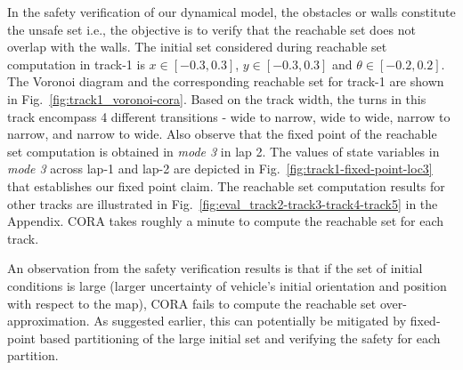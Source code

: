 In the safety verification of our dynamical model, the obstacles or walls constitute the unsafe set i.e., the objective is to verify that the reachable set does not overlap with the walls. 
%
%
The initial set considered during reachable set computation in track-1 is $x \in [-0.3, 0.3]$, $y \in [-0.3, 0.3]$ and $\theta \in [-0.2, 0.2]$.
The Voronoi diagram and the corresponding reachable set for track-1 are shown in Fig.~\ref{fig:track1_voronoi-cora}. Based on the track width, the turns in this track encompass 4 different transitions - wide to narrow, wide to wide, narrow to narrow, and narrow to wide. 
%
Also observe that the fixed point of the reachable set computation is obtained in \emph{mode 3} in lap 2. The values of state variables in \emph{mode 3} across lap-1 and lap-2 are depicted in Fig.~\ref{fig:track1-fixed-point-loc3} that establishes our fixed point claim. The reachable set computation results for other tracks are illustrated in Fig.~\ref{fig:eval_track2-track3-track4-track5} in the Appendix. CORA takes roughly a minute to compute the reachable set for each track.


%
%
An observation from the safety verification results is that if the set of initial conditions is large (larger uncertainty of vehicle's initial orientation and position with respect to the map), CORA fails to compute the reachable set over-approximation. 
%
As suggested earlier, this can potentially be mitigated by fixed-point based partitioning of the large initial set and verifying the safety for each partition.


